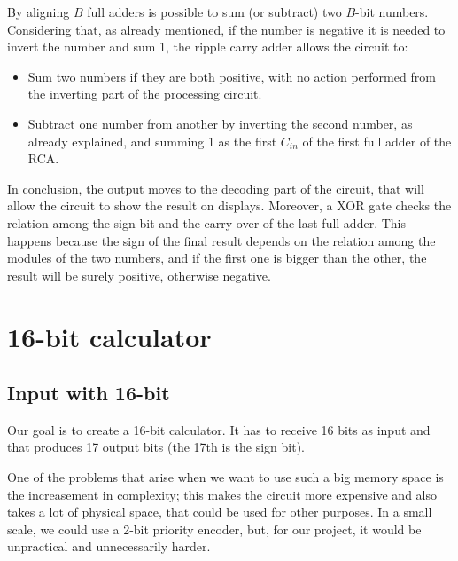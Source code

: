 \documentclass{article}
\begin{document}
By aligning $B$ full adders is possible to sum (or subtract) two $B$-bit numbers. Considering that, as already mentioned, if the number is negative it is needed to invert the number and sum 1, the ripple carry adder allows the circuit to:
\begin{itemize}
  \item Sum two numbers if they are both positive, with no action performed from the inverting part of the processing circuit.
  \item Subtract one number from another by inverting the second number, as already explained, and summing 1 as the first $C_{in}$ of the first full adder of the RCA.
\end{itemize}
  
In conclusion, the output moves to the decoding part of the circuit, that will allow the circuit to show the result on displays. Moreover, a XOR gate checks the relation among the sign bit and the carry-over of the last full adder. This happens because the sign of the final result depends on the relation among the modules of the two numbers, and if the first one is bigger than the other, the result will be surely positive, otherwise negative.





\clearpage








\clearpage

\section{16-bit calculator} \label{SimulatedCalculator}



\subsection{Input with 16-bit}

Our goal is to create a 16-bit calculator. It has to receive 16 bits as input and that produces 17 output bits (the 17th is the sign bit).

\vspace{3mm}

One of the problems that arise when we want to use such a big memory space is the increasement in complexity; this makes the circuit more expensive and also takes a lot of physical space, that could be used for other purposes. In a small scale, we could use a 2-bit priority encoder, but, for our project, it would be unpractical and unnecessarily harder.
\end{document}
